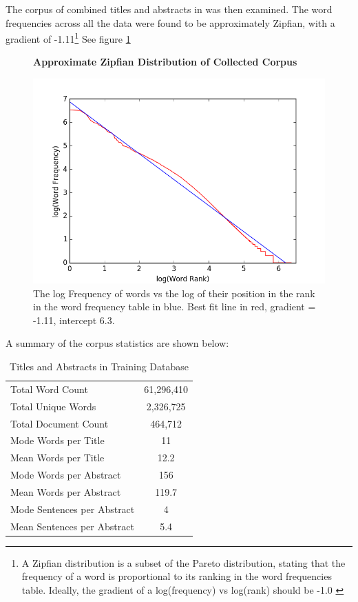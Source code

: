 The corpus of combined titles and abstracts in  was then examined. The word frequencies across all the data were found to be approximately Zipfian, with a gradient of -1.11\footnote{A Zipfian distribution is a subset of the Pareto distribution, stating that the frequency of a word is proportional to its ranking in the word frequencies table. Ideally, the gradient of a log(frequency) vs log(rank) should be -1.0 \cite{zipf}} See figure \ref{fig:ZIPF}
\begin{figure}[H]
    \centering
    \textbf{Approximate Zipfian Distribution of Collected Corpus}\par\medskip
    \includegraphics[scale=0.6]{Data_Acquisition/zipf.png}
    \caption[Zipfian Plot of Collected Corpus]{The log Frequency of words vs the log of their position in the rank in the word frequency table in blue. Best fit line in red, gradient = -1.11, intercept 6.3. }
     \label{fig:ZIPF}
\end{figure}
A summary of the corpus statistics are shown below:
\begin{table}[h!]
\caption{Titles and Abstracts in Training Database}
\label{tab:CORPUS STATS}
\begin{center}
\begin{tabular}{||l|c||}
\hline
Total Word Count & 61,296,410\\
Total Unique Words & 2,326,725\\
Total Document Count & 464,712\\
Mode Words per Title &  11\\
Mean Words per Title &  12.2\\
Mode Words per Abstract & 156\\
Mean Words per Abstract & 119.7\\
Mode Sentences per Abstract & 4\\
Mean Sentences per Abstract & 5.4\\
\hline
\end{tabular}
\end{center}
\end{table}

\label{sec:SCRAPEANALYSIS}
